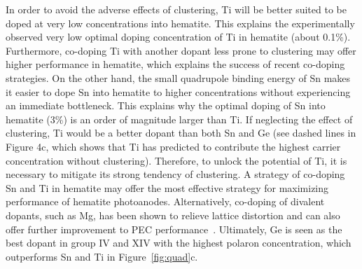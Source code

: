 In order to avoid the adverse effects of clustering, Ti will be better suited to be doped at very low concentrations into hematite.
This explains the experimentally observed very low optimal doping concentration of Ti in hematite (about 0.1\%).\cite{fu2014highly,malviya2017influence} Furthermore, co-doping Ti with another dopant less prone to clustering may offer higher performance in hematite, which explains the success of recent co-doping strategies.\cite{zhang2010improved,mirbagheri2014visible,pan2015ti}
On the other hand, the small quadrupole binding energy of Sn makes it easier to dope Sn into hematite to higher concentrations without experiencing an immediate bottleneck.
This explains why the optimal doping of Sn into hematite (3\%) is an order of magnitude larger than Ti.\cite{yang2013new,tian2020electronic,bindu2018electrical}
If neglecting the effect of clustering, Ti would be a better dopant than both Sn and Ge (see dashed lines in Figure 4c, which shows that Ti has predicted to contribute the highest carrier concentration without clustering). Therefore, to unlock the potential of Ti, it is necessary to mitigate its strong tendency of clustering.
A strategy of co-doping Sn and Ti in hematite may offer the most effective strategy for maximizing performance of hematite photoanodes.
Alternatively, co-doping of divalent dopants, such as Mg, has been shown to relieve lattice distortion and can also offer further improvement to PEC performance~\cite{cai2020engineered}.
Ultimately, Ge is seen as the best dopant in group IV and XIV with the highest polaron concentration, which outperforms Sn and Ti in Figure~\ref{fig:quad}c.

